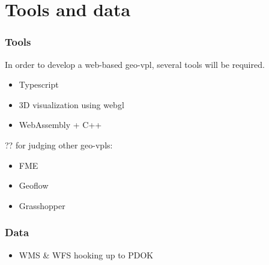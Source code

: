 \newpage
\section{Tools and data}

\subsubsection{Tools}

In order to develop a web-based geo-vpl, several tools will be required. 

\begin{itemize}
  \item Typescript
  \item 3D visualization using webgl 
  \item WebAssembly + C++ 
\end{itemize}


?? for judging other geo-vpls: 
\begin{itemize}
  \item FME
  \item Geoflow
  \item Grasshopper
\end{itemize}


\subsubsection{Data}

\begin{itemize}
  \item WMS \& WFS hooking up to PDOK
\end{itemize}
